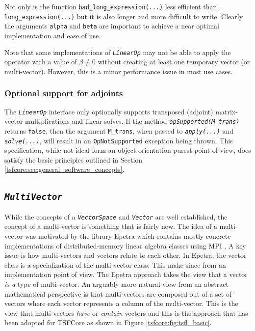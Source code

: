 Not only is the function \texttt{bad\-\_long\-\_expression(\-...)} less
efficient than \texttt{long\-\_expression(\-...)} but it is also longer
and more difficult to write.  Clearly the arguments \texttt{alpha} and
\texttt{beta} are important to achieve a near optimal implementation
and ease of use.

Note that some implementations of \texttt{\textit{LinearOp}} may not be
able to apply the operator with a value of $\beta \ne 0$ without
creating at least one temporary vector (or multi-vector).  However,
this is a minor performance issue in most use cases.

%
\subsubsection{Optional support for adjoints}
\label{tsfcore:sec:linear_op_adjoints}
%

The \texttt{\textit{LinearOp}} interface only optionally supports
transposed (adjoint) matrix-vector multiplications and linear solves.
If the method \texttt{\textit{opSupported(M\_trans)}} returns
\texttt{false}, then the argument \texttt{M\_trans}, when
passed to \texttt{\textit{apply(\-...)}} and
\texttt{\textit{solve(...)}}, will result in an
\texttt{OpNotSupported} exception being thrown.
This specification, while not ideal form an object-orientation purest
point of view, does satisfy the basic principles outlined in Section
\ref{tsfcore:sec:general_software_concepts}.

%
\subsection{\texttt{\textit{Multi\-Vector}}}
\label{tsfcore:sec:multi_vec}
%

While the concepts of a \texttt{\textit{VectorSpace}} and
\texttt{\textit{Vector}} are well established, the
concept of a multi-vector is something that is fairly new.  The idea
of a multi-vector was motivated by the library Epetra
\cite{ref:Epetra} which contains mostly concrete implementations of
distributed-memory linear algebra classes using MPI \cite{ref:mpi}.  A
key issue is how multi-vectors and vectors relate to each other.  In
Epetra, the vector class is a specialization of the multi-vector
class.  This make since from an implementation point of view.  The
Epetra approach takes the view that a vector {\em is a} type of
multi-vector.  An arguably more natural view from an abstract
mathematical perspective is that multi-vectors are composed out of a
set of vectors where each vector represents a column of the
multi-vector.  This is the view that multi-vectors {\em have} or {\em
contain} vectors and this is the approach that has been adopted for
TSFCore as shown in Figure \ref{tsfcore:fig:tsfl_basic}.

